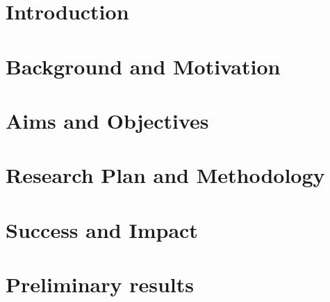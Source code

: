 \documentclass{article}
\begin{document}


\newpage



\section{Introduction}


\section{Background and Motivation}


\section{Aims and Objectives}


\section{Research Plan and Methodology}


\section{Success and Impact}


\section{Preliminary results}


\newpage

\printbibliography
\end{document}
